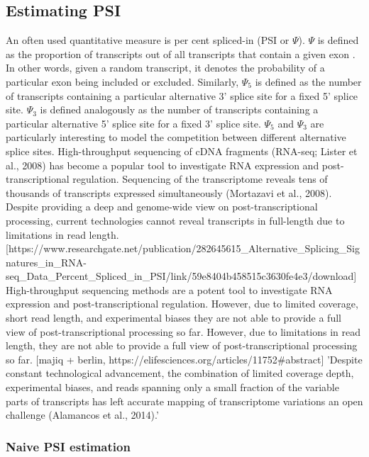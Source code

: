 \subsection{Estimating PSI} \label{subsec:psiestimation}
An often used quantitative measure is per cent spliced-in (PSI or $\Psi$).
$\Psi$ is defined as the proportion of transcripts out of all transcripts that contain a given exon \cite{psi}. In other words, given a random transcript, it denotes the probability of a particular exon being included or excluded.
Similarly, $\Psi_5$ is defined as the number of transcripts containing a particular alternative 3' splice site for a fixed 5' splice site. $\Psi_3$ is defined analogously as the number of transcripts containing a particular alternative 5' splice site for a fixed 3' splice site. $\Psi_5$ and $\Psi_3$ are particularly interesting to model the competition between different alternative splice sites.
High-throughput sequencing of cDNA fragments (RNA-seq; Lister et al., 2008) has become a popular tool to investigate RNA expression and post-transcriptional regulation. Sequencing of the transcriptome reveals tens of thousands of transcripts expressed simultaneously (Mortazavi et al., 2008). Despite providing a deep and genome-wide view on post-transcriptional processing, current technologies cannot reveal transcripts in full-length due to limitations in read length. [https://www.researchgate.net/publication/282645615_Alternative_Splicing_Signatures_in_RNA-seq_Data_Percent_Spliced_in_PSI/link/59e8404b458515c3630fe4e3/download]
High-throughput sequencing methods are a potent tool to investigate RNA expression and post-transcriptional regulation. However, due to limited coverage, short read length, and experimental biases they are not able to provide a full view of post-transcriptional processing so far.
However, due to limitations in read length, they are not able to provide a full view of post-transcriptional processing so far.
[majiq + berlin, https://elifesciences.org/articles/11752#abstract]
'Despite constant technological advancement, the combination of limited coverage depth, experimental biases, and reads spanning only a small fraction of the variable parts of transcripts has left accurate mapping of transcriptome variations an open challenge (Alamancos et al., 2014).'
\subsubsection{Naive PSI estimation}\label{subsubsec:naivepsi}

